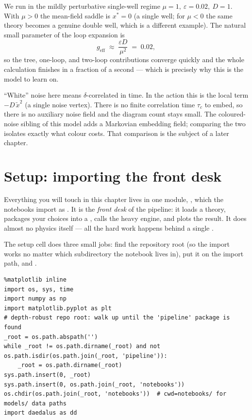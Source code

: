 We run in the mildly perturbative single-well regime
$\mu = 1,\ \varepsilon = 0.02,\ D = 1$. With $\mu > 0$ the mean-field saddle is
$x^{*} = 0$ (a single well; for $\mu < 0$ the same theory becomes a genuine
double well, which is a different example). The natural small parameter of the
loop expansion is
\[
  g_{\mathrm{eff}} \;\approx\; \frac{\varepsilon D}{\mu^{2}} \;=\; 0.02,
\]
so the tree, one-loop, and two-loop contributions converge quickly and the whole
calculation finishes in a fraction of a second --- which is precisely why this is
the model to learn on.

\begin{note}
``White'' noise here means $\delta$-correlated in time. In the \msrjd{} action
this is the local term $-D\,\tilde x^{2}$ (a single noise vertex). There is no
finite correlation time $\tau_c$ to embed, so there is no auxiliary noise field
and the diagram count stays small. The coloured-noise sibling of this model adds
a Markovian embedding field; comparing the two isolates exactly what colour
costs. That comparison is the subject of a later chapter.
\end{note}

\section{Setup: importing the front desk}

Everything you will touch in this chapter lives in one module,
, which the notebooks import as . It is the
\emph{front desk} of the pipeline: it loads a theory, packages your choices into
a , calls the heavy engine, and plots the result. It does almost no
physics itself --- all the hard work happens behind a single
.

The setup cell does three small jobs: find the repository root (so the import
works no matter which subdirectory the notebook lives in), put it on the import
path, and .

\begin{lstlisting}
%matplotlib inline
import os, sys, time
import numpy as np
import matplotlib.pyplot as plt
# depth-robust repo root: walk up until the 'pipeline' package is found
_root = os.path.abspath('')
while _root != os.path.dirname(_root) and not os.path.isdir(os.path.join(_root, 'pipeline')):
    _root = os.path.dirname(_root)
sys.path.insert(0, _root)
sys.path.insert(0, os.path.join(_root, 'notebooks'))
os.chdir(os.path.join(_root, 'notebooks'))  # cwd=notebooks/ for models/ data paths
import daedalus as dd
\end{lstlisting}


